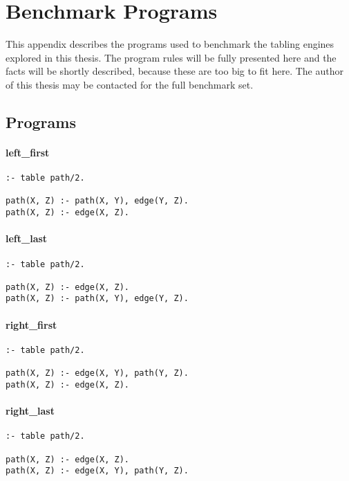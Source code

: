 \chapter{Benchmark Programs}\label{app:code}

This appendix describes the programs used to benchmark the tabling engines
explored in this thesis. The program rules will be fully presented here and
the facts will be shortly described, because these are too big to fit here.
The author of this thesis may be contacted for the full benchmark set.

\section{Programs}

\subsubsection*{left\_first}

\begin{Verbatim}
:- table path/2.

path(X, Z) :- path(X, Y), edge(Y, Z).
path(X, Z) :- edge(X, Z).
\end{Verbatim}

\subsubsection*{left\_last}

\begin{Verbatim}
:- table path/2.

path(X, Z) :- edge(X, Z).
path(X, Z) :- path(X, Y), edge(Y, Z).
\end{Verbatim}

\subsubsection*{right\_first}

\begin{Verbatim}
:- table path/2.

path(X, Z) :- edge(X, Y), path(Y, Z).
path(X, Z) :- edge(X, Z).
\end{Verbatim}

\subsubsection*{right\_last}

\begin{Verbatim}
:- table path/2.

path(X, Z) :- edge(X, Z).
path(X, Z) :- edge(X, Y), path(Y, Z).
\end{Verbatim}

